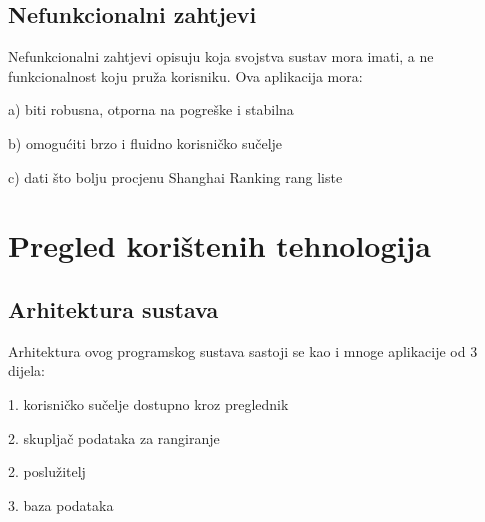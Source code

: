 \documentclass[times, utf8, zavrsni]{fer}
\begin{document}
\section{Nefunkcionalni zahtjevi}
Nefunkcionalni zahtjevi opisuju koja svojstva sustav mora imati, a ne funkcionalnost koju pruža korisniku. Ova aplikacija mora:

a) biti robusna, otporna na pogreške i stabilna

b) omogućiti brzo i fluidno korisničko sučelje

c) dati što bolju procjenu Shanghai Ranking rang liste

\chapter{Pregled korištenih tehnologija}
\section{Arhitektura sustava}
\label{arhitektura}
Arhitektura ovog programskog sustava sastoji se kao i mnoge aplikacije od 3 dijela:

1. korisničko sučelje dostupno kroz preglednik

2. skupljač podataka za rangiranje

2. poslužitelj

3. baza podataka
\end{document}

